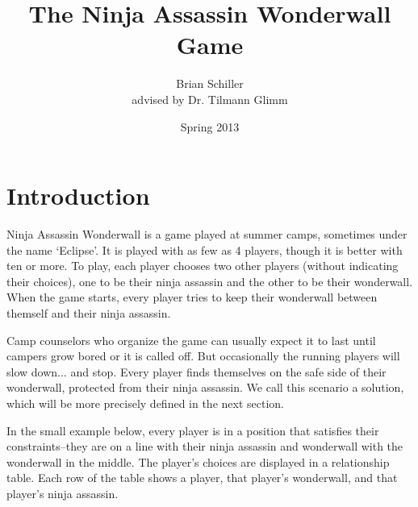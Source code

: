 \documentclass[12pt]{article}
\title{The Ninja Assassin Wonderwall Game}
\author{Brian Schiller \\ { advised by Dr. Tilmann Glimm}}
\date{Spring 2013}
\begin{document}
\maketitle

\tableofcontents

\section{Introduction}
    Ninja Assassin Wonderwall is a game played at summer camps, sometimes under the name `Eclipse'. It is played with as few as 4 players, though it is better with ten or more. To play, each player chooses two other players (without indicating their choices), one to be their ninja assassin and the other to be their wonderwall. When the game starts, every player tries to keep their wonderwall between themself and their ninja assassin.

    Camp counselors who organize the game can usually expect it to last until campers grow bored or it is called off. But occasionally the running players will slow down... and stop. Every player finds themselves on the safe side of their wonderwall, protected from their ninja assassin. We call this scenario a solution, which will be more precisely defined in the next section.

    In the small example below, every player is in a position that satisfies their constraints--they are on a line with their ninja assassin and wonderwall with the wonderwall in the middle. The player's choices are displayed in a relationship table. Each row of the table shows a player, that player's wonderwall, and that player's ninja assassin.
\end{document}
